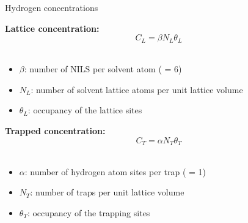 \documentclass[9pt]{beamer}
\begin{document}
\begin{frame}[noframenumbering]{Hydrogen concentrations}

    \textbf{Lattice concentration:}\\
    
    \begin{equation*}
        \boxed{C_L = \beta N_L \theta_L}
    \end{equation*}\\
    
    \begin{itemize}
        \item $\beta$: number of NILS per solvent atom ( = 6)\\
        \item $N_L$: number of solvent lattice atoms per unit lattice volume \\
        \item $\theta_L$: occupancy of the lattice sites 
    \end{itemize}

    \vspace{0.5cm}

    \textbf{Trapped concentration:}\\

    \begin{equation*}
        \boxed{C_T = \alpha N_T \theta_T}
    \end{equation*}\\
    
    \begin{itemize}
        \item $\alpha$: number of hydrogen atom sites per trap ( = 1) \\
        \item $N_T$: number of traps per unit lattice volume \\
        \item $\theta_T$: occupancy of the trapping sites 
    \end{itemize}

\end{frame}

\end{document}
